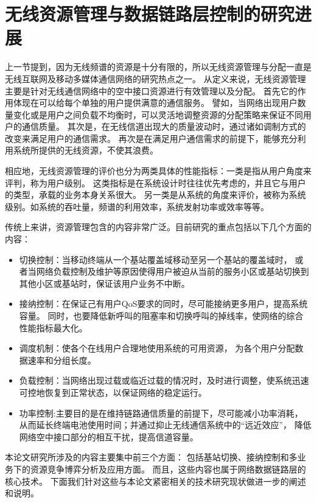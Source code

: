 \section{无线资源管理与数据链路层控制的研究进展}
上一节提到，因为无线频谱的资源是十分有限的，所以无线资源管理与分配一直是无线互联网及移动多媒体通信网络的研究热点之一。
从定义来说，无线资源管理主要是针对无线通信网络中的空中接口资源进行有效管理以及分配。
首先它的作用体现在可以给每个单独的用户提供满意的通信服务。
譬如，当网络出现用户数量变化或是用户之间负载不均衡时，可以灵活地调整资源的分配策略来保证不同用户的通信质量。
其次是，在无线信道出现大的质量波动时，通过诸如调制方式的改变来满足用户的通信需求。
再次是在满足用户通信需求的前提下，能够充分利用系统所提供的无线资源，不使其浪费。

相应地，无线资源管理的评价也分为两类具体的性能指标：一类是指从用户角度来评判，称为用户级别。
这类指标是在系统设计时往往优先考虑的，并且它与用户的类型，承载的业务本身关系很大。
另一类是从系统的角度来评价，被称为系统级别。如系统的吞吐量，频谱的利用效率，系统发射功率或效率等等。

%
传统上来讲，资源管理包含的内容非常广泛。目前研究的重点包括以下几个方面的内容：

\begin{itemize}
\item 切换控制：当移动终端从一个基站覆盖域移动至另一个基站的覆盖域时，
    或者当网络负载控制及维护等原因使得用户被迫从当前的服务小区或基站切换到其他小区或基站时，保证该用户业务不中断。
\item 接纳控制：在保证己有用户QoS要求的同时，尽可能接纳更多用户，提高系统容量。 同时，也要降低新呼叫的阻塞率和切换呼叫的掉线率，使网络的综合性能指标最大化。 
 \item 调度机制：使各个在线用户合理地使用系统的可用资源，
    为各个用户分配数据速率和分组长度。
\item 负载控制：当网络出现过载或临近过载的情况时，及时进行调整，使系统迅速可控地恢复到正常状态，以保证网络的稳定运行。
\item 功率控制:主要目的是在维持链路通信质量的前提下，尽可能减小功率消耗，
从而延长终端电池使用时间；并通过抑止无线通信系统中的“远近效应”，
降低网络空中接口部分的相互干扰，提高信道容量。
\end{itemize}

本论文研究所涉及的内容主要集中前三个方面：
包括基站切换、接纳控制和多业务下的资源竞争博弈分析及应用方面。
而且，这些内容也属于网络数据链路层的核心技术。
下面我们针对这些与本论文紧密相关的技术研究现状做进一步的阐述和说明。

